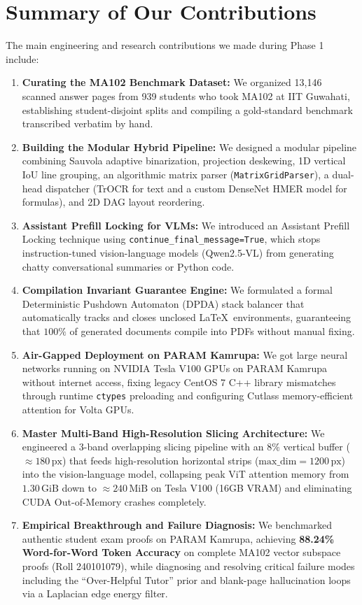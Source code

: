 \section{Summary of Our Contributions}
\label{sec:contributions}

The main engineering and research contributions we made during Phase 1 include:
\begin{enumerate}
    \item \textbf{Curating the MA102 Benchmark Dataset:} We organized 13,146 scanned answer pages from 939 students who took MA102 at IIT Guwahati, establishing student-disjoint splits and compiling a gold-standard benchmark transcribed verbatim by hand.
    \item \textbf{Building the Modular Hybrid Pipeline:} We designed a modular pipeline combining Sauvola adaptive binarization, projection deskewing, 1D vertical IoU line grouping, an algorithmic matrix parser (\texttt{MatrixGridParser}), a dual-head dispatcher (TrOCR for text and a custom DenseNet HMER model for formulas), and 2D DAG layout reordering.
    \item \textbf{Assistant Prefill Locking for VLMs:} We introduced an Assistant Prefill Locking technique using \texttt{continue\_final\_message=True}, which stops instruction-tuned vision-language models (Qwen2.5-VL) from generating chatty conversational summaries or Python code.
    \item \textbf{Compilation Invariant Guarantee Engine:} We formulated a formal Deterministic Pushdown Automaton (DPDA) stack balancer that automatically tracks and closes unclosed \LaTeX\ environments, guaranteeing that $100\%$ of generated documents compile into PDFs without manual fixing.
    \item \textbf{Air-Gapped Deployment on PARAM Kamrupa:} We got large neural networks running on NVIDIA Tesla V100 GPUs on PARAM Kamrupa without internet access, fixing legacy CentOS 7 C++ library mismatches through runtime \texttt{ctypes} preloading and configuring Cutlass memory-efficient attention for Volta GPUs.
    \item \textbf{Master Multi-Band High-Resolution Slicing Architecture:} We engineered a 3-band overlapping slicing pipeline with an $8\%$ vertical buffer ($\approx 180\,\text{px}$) that feeds high-resolution horizontal strips ($\text{max\_dim} = 1200\,\text{px}$) into the vision-language model, collapsing peak ViT attention memory from $1.30\,\text{GiB}$ down to $\approx 240\,\text{MiB}$ on Tesla V100 (16GB VRAM) and eliminating CUDA Out-of-Memory crashes completely.
    \item \textbf{Empirical Breakthrough and Failure Diagnosis:} We benchmarked authentic student exam proofs on PARAM Kamrupa, achieving \textbf{88.24\% Word-for-Word Token Accuracy} on complete MA102 vector subspace proofs (Roll 240101079), while diagnosing and resolving critical failure modes including the ``Over-Helpful Tutor'' prior and blank-page hallucination loops via a Laplacian edge energy filter.
\end{enumerate}

